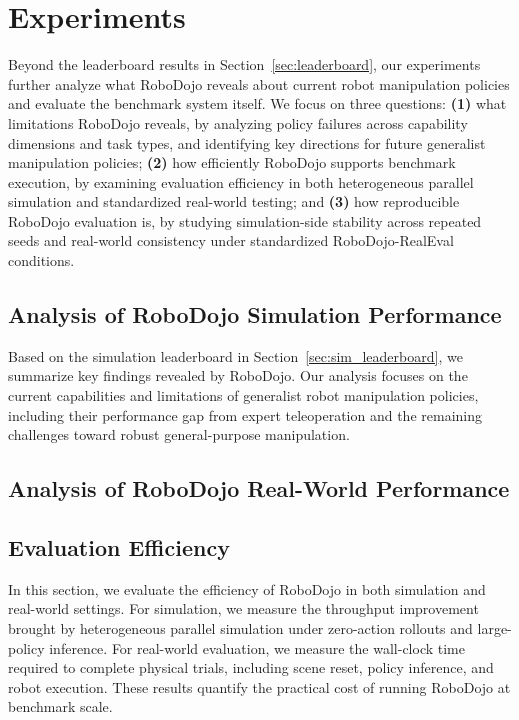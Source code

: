 \section{Experiments}
\label{sec:experiments}

Beyond the leaderboard results in Section~\ref{sec:leaderboard}, our experiments further analyze what RoboDojo reveals about current robot manipulation policies and evaluate the benchmark system itself. We focus on three questions:
\textbf{\textcolor{Blue_1}{(1)}} what limitations RoboDojo reveals, by analyzing policy failures across capability dimensions and task types, and identifying key directions for future generalist manipulation policies;
\textbf{\textcolor{Blue_1}{(2)}} how efficiently RoboDojo supports benchmark execution, by examining evaluation efficiency in both heterogeneous parallel simulation and standardized real-world testing; and
\textbf{\textcolor{Blue_1}{(3)}} how reproducible RoboDojo evaluation is, by studying simulation-side stability across repeated seeds and real-world consistency under standardized RoboDojo-RealEval conditions.

\subsection{Analysis of RoboDojo Simulation Performance}

Based on the simulation leaderboard in Section~\ref{sec:sim_leaderboard}, we summarize key findings revealed by RoboDojo. Our analysis focuses on the current capabilities and limitations of generalist robot manipulation policies, including their performance gap from expert teleoperation and the remaining challenges toward robust general-purpose manipulation.



\subsection{Analysis of RoboDojo Real-World Performance}



\subsection{Evaluation Efficiency}
\label{sec:evaluation_efficiency}

In this section, we evaluate the efficiency of RoboDojo in both simulation and real-world settings. For simulation, we measure the throughput improvement brought by heterogeneous parallel simulation under zero-action rollouts and large-policy inference. For real-world evaluation, we measure the wall-clock time required to complete physical trials, including scene reset, policy inference, and robot execution. These results quantify the practical cost of running RoboDojo at benchmark scale.

